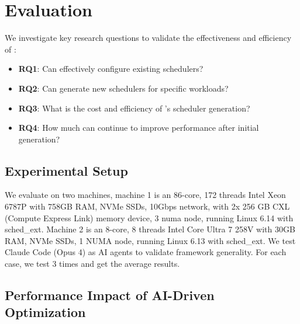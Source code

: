 \section{Evaluation}
\label{sec:evaluation}


We investigate key research questions to validate the effectiveness and efficiency of \sys:

\begin{itemize}
\item \textbf{RQ1}: Can \sys effectively configure existing schedulers?
\item \textbf{RQ2}: Can \sys generate new schedulers for specific workloads?
\item \textbf{RQ3}: What is the cost and efficiency of \sys's scheduler generation?
\item \textbf{RQ4}: How much can \agent continue to improve performance after initial generation?
\end{itemize}

\subsection{Experimental Setup}

We evaluate \sys on two machines, machine 1 is an 86-core, 172 threads Intel Xeon 6787P with 758GB RAM, NVMe SSDs, 10Gbps network, with 2x 256 GB CXL (Compute Express Link) memory device, 3 numa node, running Linux 6.14 with sched\_ext. Machine 2 is an 8-core, 8 threads Intel Core Ultra 7 258V with 30GB RAM, NVMe SSDs, 1 NUMA node, running Linux 6.13 with sched\_ext. We test Claude Code (Opus 4) as AI agents to validate framework generality. For each case, we test 3 times and get the average results.

\subsection{Performance Impact of AI-Driven Optimization}


